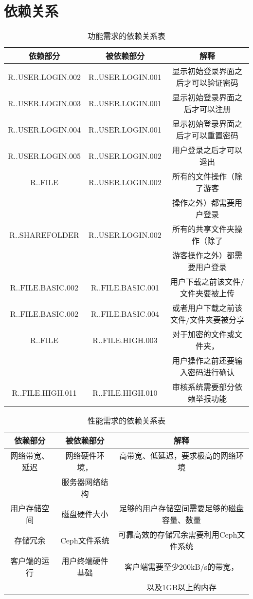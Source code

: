 \chapter{依赖关系}

\begin{table}[htbp]
\centering
\caption{功能需求的依赖关系表} \label{tab:simpletable}
\begin{tabular}{|c|c|c|}
    \hline
    依赖部分 & 被依赖部分 & 解释  \\
    \hline
    R..USER.LOGIN.002 & R..USER.LOGIN.001 & 显示初始登录界面之后才可以验证密码 \\
    \hline
    R..USER.LOGIN.003 & R..USER.LOGIN.001 & 显示初始登录界面之后才可以注册 \\
    \hline
    R..USER.LOGIN.004 & R..USER.LOGIN.001 & 显示初始登录界面之后才可以重置密码 \\
    \hline
    R..USER.LOGIN.005 & R..USER.LOGIN.002 & 用户登录之后才可以退出 \\
    \hline
    R..FILE & R..USER.LOGIN.002 & 所有的文件操作（除了游客\\ &  &操作之外）都需要用户登录 \\ 
    \hline
    R..SHAREFOLDER & R..USER.LOGIN.002 & 所有的共享文件夹操作（除了\\ &  &游客操作之外）都需要用户登录\\
    \hline
    R..FILE.BASIC.002 & R..FILE.BASIC.001 & 用户下载之前该文件/文件夹要被上传 \\
    \hline
    R..FILE.BASIC.002 & R..FILE.BASIC.004 & 或者用户下载之前该文件/文件夹要被分享 \\
    \hline
    R..FILE & R..FILE.HIGH.003 & 对于加密的文件或文件夹，\\ &  & 用户操作之前还要输入密码进行确认\\
    \hline
    R..FILE.HIGH.011 & R..FILE.HIGH.010 & 审核系统需要部分依赖举报功能 \\
    \hline
    
\end{tabular}
\end{table} 


\begin{table}[htbp]
\centering
\caption{性能需求的依赖关系表} \label{tab:simpletable}
\begin{tabular}{|c|c|c|}
    \hline
    依赖部分 & 被依赖部分 & 解释  \\
    \hline
    网络带宽、延迟 & 网络硬件环境， & 高带宽、低延迟，要求极高的网络环境 \\
    & 服务器网络结构 &  \\
    \hline
    用户存储空间 & 磁盘硬件大小 & 足够的用户存储空间需要足够的磁盘容量、数量 \\
    \hline
    存储冗余 & Ceph文件系统 & 可靠高效的存储冗余需要利用Ceph文件系统 \\
    \hline
    客户端的运行 & 用户终端硬件基础 & 客户端需要至少200kB/s的带宽，\\ & & 以及1GB以上的内存 \\
    \hline
    
\end{tabular}
\end{table} 





